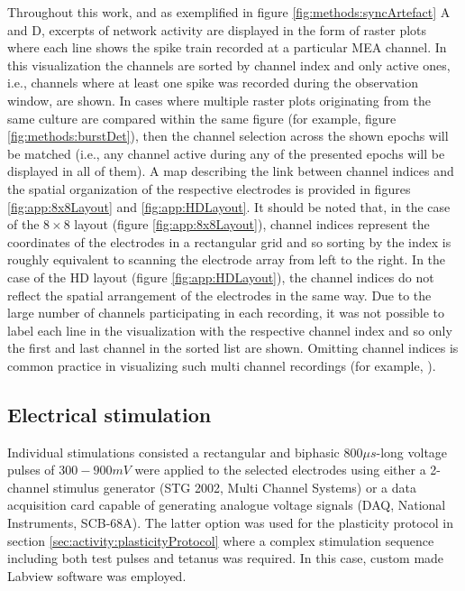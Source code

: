 Throughout this work, and as exemplified in figure \ref{fig:methods:syncArtefact} A and D, excerpts of network activity are displayed in the form of raster plots where each line shows the spike train recorded at a particular MEA channel. In this visualization the channels are sorted by channel index and only active ones, i.e., channels where at least one spike was recorded during the observation window, are shown. In cases where multiple raster plots originating from the same culture are compared within the same figure (for example, figure \ref{fig:methods:burstDet}), then the channel selection across the shown epochs will be matched (i.e., any channel active during any of the presented epochs will be displayed in all of them). A map describing the link between channel indices and the spatial organization of the respective electrodes is provided in figures \ref{fig:app:8x8Layout} and \ref{fig:app:HDLayout}. It should be noted that, in the case of the \(8\times 8\) layout (figure \ref{fig:app:8x8Layout}), channel indices represent the coordinates of the electrodes in a rectangular grid and so sorting by the index is roughly equivalent to scanning the electrode array from left to the right. In the case of the HD layout (figure \ref{fig:app:HDLayout}), the channel indices do not reflect the spatial arrangement of the electrodes in the same way. Due to the large number of channels participating in each recording, it was not possible to label each line in the visualization with the respective channel index and so only the first and last channel in the sorted list are shown. Omitting channel indices is common practice in visualizing such multi channel recordings (for example, \cite{chiappalone2006dissociated,wagenaar2006extremely,penn2016network}).

\subsection{Electrical stimulation}
Individual stimulations consisted a rectangular and biphasic \(800 \mu s\)-long voltage pulses of \(300-900 mV\) were applied to the selected electrodes using either a 2-channel stimulus generator (STG 2002, Multi Channel Systems) or a data acquisition card capable of generating analogue voltage signals (DAQ, National Instruments, SCB-68A). The latter option was used for the plasticity protocol in section \ref{sec:activity:plasticityProtocol} where a complex stimulation sequence including both test pulses and tetanus was required. In this case, custom made Labview software was employed.

